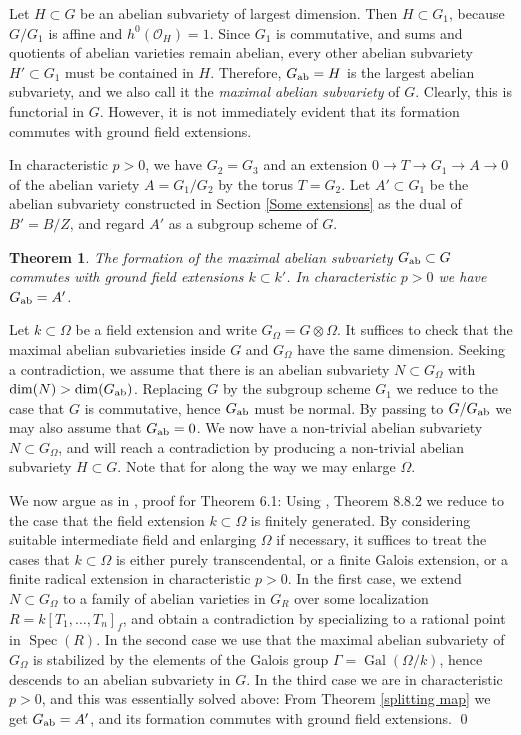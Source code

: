 \documentclass[oneside, 12pt]{amsart}
\newcommand\mylabel[1]{\label{#1}\marginpar{\raggedright\vspace{-1ex}\medskip\medskip\footnotesize \tt #1}}
\renewcommand\mylabel[1]{\label{#1}}
\newtheorem{theorem}{Theorem}[section]
\theoremstyle{definition}
\theoremstyle{remark}
\newcommand{\Gal}{\operatorname{Gal}}
\renewcommand{\O}{\mathscr{O}}
\newcommand{\ra}{\rightarrow}
\newcommand{\Spec}{\operatorname{Spec}}
\begin{document}
\medskip
Let $H\subset G$ be an abelian subvariety of largest dimension.
Then $H\subset G_1$, because  $G/G_1$ is affine and $h^0(\O_H)=1$.
Since $G_1$ is commutative, and    sums and quotients of abelian varieties remain abelian,
every other abelian subvariety $H'\subset G_1$ must be contained in $H$.
Therefore, $G_{\text{\rm ab}}=H$ is the largest abelian subvariety, and  we also call it 
the \emph{maximal abelian subvariety} of $G$. Clearly, this is functorial in $G$.
However, it is not immediately evident that its formation commutes with ground field extensions.

In characteristic $p>0$, we have $G_2=G_3$ and   an extension $0\ra T\ra G_1\ra A\ra 0$
of the abelian variety $A=G_1/G_2$ by the torus $T=G_2$.  Let $A'\subset G_1$ be the abelian subvariety
constructed in Section \ref{Some extensions} as the dual of $B'=B/Z$, and regard $A'$
as a subgroup scheme of $G$.  

\begin{theorem}
\mylabel{maximal abelian base-change}
The formation of the maximal abelian subvariety $G_{\text{\rm ab}}\subset G$ commutes with ground field extensions $k\subset k'$.
In characteristic $p>0$  we have $G_{\text{\rm ab}}=A'$.
\end{theorem}

\proof
Let $k\subset\Omega$ be a field extension and write $G_\Omega=G\otimes \Omega$.
It suffices to check that the maximal abelian subvarieties inside $G$ and $G_\Omega$ have the same dimension.
Seeking a contradiction, we assume that there is an abelian subvariety $N\subset G_\Omega$ with $\dim(N)>\dim(G_{\text{\rm ab}})$.
Replacing $G$ by the subgroup scheme $G_1$ we reduce to the case that $G$ is commutative,
hence  $G_{\text{\rm ab}}$ must be normal. By passing to $G/G_{\text{\rm ab}}$ we may also assume that $G_{\text{\rm ab}}=0$.
We now have a non-trivial abelian subvariety $N\subset G_\Omega$, and will reach a contradiction by producing
a non-trivial abelian subvariety $H\subset G$.  Note that for along the way  we may enlarge $\Omega$.

We now argue as in \cite{Schroeer 2022}, proof for Theorem 6.1:
Using \cite{EGA IVc}, Theorem 8.8.2 we   reduce to the case that  the field extension $k\subset\Omega$ is finitely generated.
By considering suitable intermediate field and enlarging  $\Omega$ if necessary, it suffices to treat the 
cases that $k\subset\Omega$ is either purely transcendental, or a finite Galois extension, or a finite radical extension in characteristic $p>0$.
In the first case, we extend $N\subset G_\Omega$ to a family of abelian varieties in $G_R$ over some
localization $R=k[T_1,\ldots,T_n]_f$, and obtain a contradiction by specializing to a rational point
in $\Spec(R)$. 
In the second case we use that the maximal abelian subvariety of $G_\Omega$ is stabilized by the elements
of the Galois group $\Gamma=\Gal(\Omega/k)$, hence descends to an abelian subvariety in $G$.
In the third case we are in characteristic $p>0$, and this was 
 essentially solved above:  From Theorem \ref{splitting map} we   get  $G_{\text{\rm ab}}=A'$, and its formation   commutes with ground field
extensions. 
\qed
\end{document}
